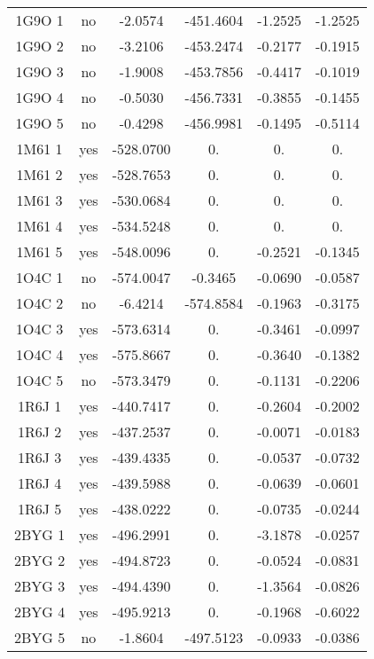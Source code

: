 \begin{table}[h]
\begin{tabular}{cccccc}
        1G9O 1 & no   &  -2.0574   & -451.4604 & -1.2525 & -1.2525 \\ 
        1G9O 2 & no   &  -3.2106   & -453.2474 & -0.2177 & -0.1915 \\ 
        1G9O 3 & no   &  -1.9008   & -453.7856 & -0.4417 & -0.1019 \\ 
        1G9O 4 & no   &  -0.5030   & -456.7331 & -0.3855 & -0.1455 \\ 
        1G9O 5 & no   &  -0.4298   & -456.9981 & -0.1495 & -0.5114 \\ 
        1M61 1 & yes  & -528.0700 & 0. & 0. & 0. \\               
        1M61 2 & yes  & -528.7653 & 0. & 0. & 0. \\               
        1M61 3 & yes  & -530.0684 & 0. & 0. & 0. \\               
        1M61 4 & yes  & -534.5248 & 0. & 0. & 0.\\               
        1M61 5 & yes  & -548.0096 & 0. & -0.2521 & -0.1345 \\     
        1O4C 1 & no   &  -574.0047 & -0.3465 & -0.0690 & -0.0587 \\    
        1O4C 2 & no   &  -6.4214   & -574.8584 & -0.1963 & -0.3175 \\         
        1O4C 3 & yes  & -573.6314 &  0. & -0.3461 & -0.0997 \\             
        1O4C 4 & yes  & -575.8667 &  0. & -0.3640 & -0.1382 \\             
        1O4C 5 & no   & -573.3479 &  0. & -0.1131 & -0.2206 \\      
        1R6J 1 & yes  & -440.7417 &  0. & -0.2604 & -0.2002 \\        
        1R6J 2 & yes  & -437.2537 &  0. & -0.0071 & -0.0183 \\        
        1R6J 3 & yes  & -439.4335 &  0. & -0.0537 & -0.0732 \\       
        1R6J 4 & yes  & -439.5988 &  0. & -0.0639 & -0.0601 \\        
        1R6J 5 & yes  & -438.0222 &  0. & -0.0735 & -0.0244 \\        
        2BYG 1 & yes  & -496.2991 &  0. & -3.1878 & -0.0257 \\        
        2BYG 2 & yes  & -494.8723 &  0. & -0.0524 & -0.0831 \\        
        2BYG 3 & yes  & -494.4390 &  0. & -1.3564 & -0.0826 \\        
        2BYG 4 & yes  & -495.9213 &  0. & -0.1968 & -0.6022 \\        
        2BYG 5 & no   &  -1.8604   & -497.5123 & -0.0933 & -0.0386 \\   
       \bottomrule


 \end{tabular}   
\label{tab:result_20_actives}   
\end{table}


